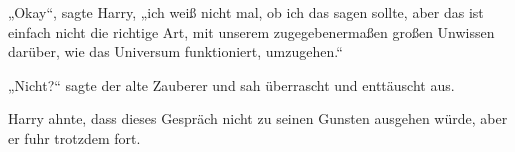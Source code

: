 „Okay“, sagte Harry, „ich weiß nicht mal, ob ich das sagen sollte, aber das ist einfach nicht die richtige Art, mit unserem zugegebenermaßen großen Unwissen darüber, wie das Universum funktioniert, umzugehen.“

„Nicht?“ sagte der alte Zauberer und sah überrascht und enttäuscht aus.

Harry ahnte, dass dieses Gespräch nicht zu seinen Gunsten ausgehen würde, aber er fuhr trotzdem fort.
